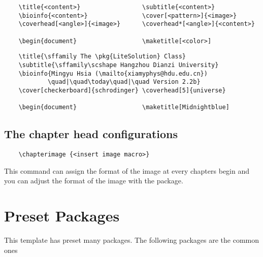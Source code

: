 \documentclass[mtpro2,twoside,openany]{litesolution}
\begin{document}
\begin{verbatim}
    \title{<content>}                 \subtitle{<content>}
    \bioinfo{<content>}               \cover[<pattern>]{<image>}
    \coverhead[<angle>]{<image>}      \coverhead*[<angle>]{<content>}

    \begin{document}                  \maketitle[<color>]
\end{verbatim}

\begin{verbatim}
    \title{\sffamily The \pkg{LiteSolution} Class}
    \subtitle{\sffamily\scshape Hangzhou Dianzi University}
    \bioinfo{Mingyu Hsia (\mailto{xiamyphys@hdu.edu.cn})
            \quad|\quad\today\quad|\quad Version 2.2b}
    \cover[checkerboard]{schrodinger} \coverhead[5]{universe}

    \begin{document}                  \maketitle[Midnightblue]
\end{verbatim}

\subsection{The chapter head configurations}

\begin{verbatim}
    \chapterimage {<insert image macro>}
\end{verbatim}

This command can assign the format of the image at every chapters begin and you can adjust the format of the image with the  package.

\section{Preset Packages}

This template has preset many packages. The following packages are the common ones
\end{document}
